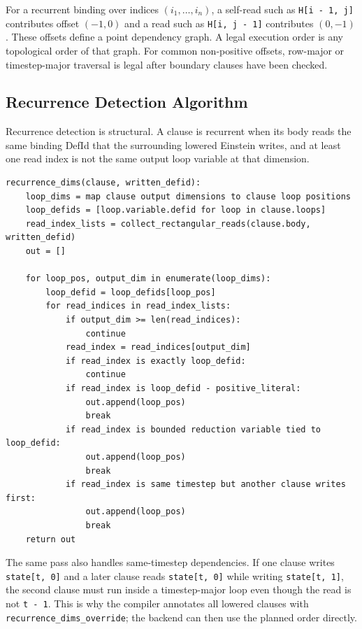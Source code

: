 For a recurrent binding over indices $(i_1,\ldots,i_n)$, a self-read such as
\texttt{H[i - 1, j]} contributes offset $(-1,0)$ and a read such as
\texttt{H[i, j - 1]} contributes $(0,-1)$. These offsets define a point
dependency graph. A legal execution order is any topological order of that
graph. For common non-positive offsets, row-major or timestep-major traversal is
legal after boundary clauses have been checked.

\subsection{Recurrence Detection Algorithm}

Recurrence detection is structural. A clause is recurrent when its body reads
the same binding DefId that the surrounding lowered Einstein writes, and at
least one read index is not the same output loop variable at that dimension.

\begin{lstlisting}[style=pythoncode,caption={Structural recurrence detection.}]
recurrence_dims(clause, written_defid):
    loop_dims = map clause output dimensions to clause loop positions
    loop_defids = [loop.variable.defid for loop in clause.loops]
    read_index_lists = collect_rectangular_reads(clause.body, written_defid)
    out = []

    for loop_pos, output_dim in enumerate(loop_dims):
        loop_defid = loop_defids[loop_pos]
        for read_indices in read_index_lists:
            if output_dim >= len(read_indices):
                continue
            read_index = read_indices[output_dim]
            if read_index is exactly loop_defid:
                continue
            if read_index is loop_defid - positive_literal:
                out.append(loop_pos)
                break
            if read_index is bounded reduction variable tied to loop_defid:
                out.append(loop_pos)
                break
            if read_index is same timestep but another clause writes first:
                out.append(loop_pos)
                break
    return out
\end{lstlisting}

The same pass also handles same-timestep dependencies. If one clause writes
\texttt{state[t, 0]} and a later clause reads \texttt{state[t, 0]} while writing
\texttt{state[t, 1]}, the second clause must run inside a timestep-major loop
even though the read is not \texttt{t - 1}. This is why the compiler annotates
all lowered clauses with \texttt{recurrence\_dims\_override}; the backend can
then use the planned order directly.


